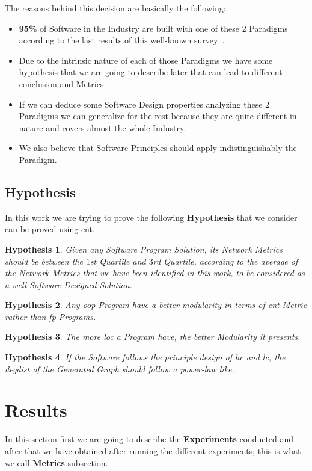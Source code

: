 \documentclass[12pt, a4paper]{article}
\newtheorem{hyp}{Hypothesis}
\begin{document}
The reasons behind this decision are basically the following:

\begin{itemize}
    \item \textbf{95\%} of Software in the Industry are built with one of these 2 Paradigms according to the last results of this well-known survey~\cite{so_survey}.
    \item Due to the intrinsic nature of each of those Paradigms we have some hypothesis that we are going to describe later that can lead to different conclusion and Metrics
    \item If we can deduce some Software Design properties analyzing these 2 Paradigms we can generalize for the rest because they are quite different in nature and covers almost the whole Industry.
    \item We also believe that Software Principles should apply indistinguishably the Paradigm. 
\end{itemize}


\subsection{Hypothesis}
In this work we are trying to prove the following \textbf{Hypothesis} that we consider can be proved using \acrfull{cnt}.

\begin{hyp}
Given any Software Program Solution, its Network Metrics should be between the  $1$st Quartile and $3$rd Quartile, according to the average of the Network Metrics that we have been identified in this work,
to be considered as a well Software Designed Solution.
\end{hyp}

\begin{hyp}
Any \acrlong{oop} Program have a better modularity in terms of \acrlong{cnt} Metric rather than \acrlong{fp} Programs.
\end{hyp}

\begin{hyp}
The more \acrfull{loc} a Program have, the better Modularity it presents.
\end{hyp}
    
\begin{hyp}
If the Software follows the principle design of \acrshort{hc} and \acrshort{lc}, the \acrfull{degdist} of the Generated Graph should follow a power-law like.
\end{hyp}

\section{Results}
In this section first we are going to describe the \textbf{Experiments} conducted and after that we have obtained after running the different experiments; this is what we call \textbf{Metrics} subsection.
\end{document}
